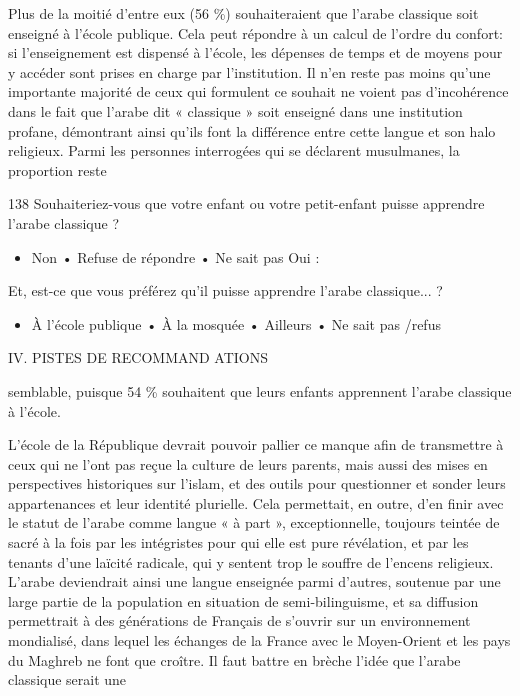 Plus de la moitié d'entre eux (56 \%) souhaiteraient que l'arabe
classique soit enseigné à l'école publique. Cela peut répondre à un
calcul de l'ordre du confort: si l'enseignement est dispensé à l'école,
les dépenses de temps et de moyens pour y accéder sont prises en charge
par l'institution. Il n'en reste pas moins qu'une importante majorité de
ceux qui formulent ce souhait ne voient pas d'incohérence dans le fait
que l'arabe dit « classique » soit enseigné dans une institution
profane, démontrant ainsi qu'ils font la différence entre cette langue
et son halo religieux. Parmi les personnes interrogées qui se déclarent
musulmanes, la proportion reste

138 Souhaiteriez-vous que votre enfant ou votre petit-enfant puisse
apprendre l'arabe classique ?


\begin{itemize}
\item
  Non • Refuse de répondre • Ne sait pas Oui :
\end{itemize}


Et, est-ce que vous préférez qu'il puisse apprendre l'arabe classique...
?


\begin{itemize}
\item
  
  À l'école publique • À la mosquée • Ailleurs • Ne sait pas /refus
  
\end{itemize}


IV. PISTES DE RECOMMAND ATIONS

semblable, puisque 54 \% souhaitent que leurs enfants apprennent l'arabe
classique à l'école.

L'école de la République devrait pouvoir pallier ce manque afin de
transmettre à ceux qui ne l'ont pas reçue la culture de leurs parents,
mais aussi des mises en perspectives historiques sur l'islam, et des
outils pour questionner et sonder leurs appartenances et leur identité
plurielle. Cela permettait, en outre, d'en finir avec le statut de
l'arabe comme langue « à part », exceptionnelle, toujours teintée de
sacré à la fois par les intégristes pour qui elle est pure révélation,
et par les tenants d'une laïcité radicale, qui y sentent trop le souffre
de l'encens religieux. L'arabe deviendrait ainsi une langue enseignée
parmi d'autres, soutenue par une large partie de la population en
situation de semi-bilinguisme, et sa diffusion permettrait à des
générations de Français de s'ouvrir sur un environnement mondialisé,
dans lequel les échanges de la France avec le Moyen-Orient et les pays
du Maghreb ne font que croître. Il faut battre en brèche l'idée que
l'arabe classique serait une

